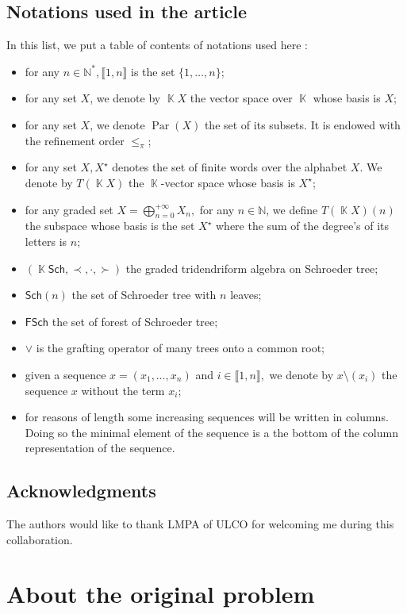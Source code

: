 \documentclass[a4paper,10pt]{amsart}
\DeclareMathOperator{\Par}{Par}
\DeclareMathOperator{\K}{\mathbb{K}}
\newcommand\Sch{\mathsf{Sch}}
\newcommand\SchF{\mathsf{FSch}}
\newcommand\nn{n}
\newcommand\NN{\mathbb{N}}
\newcommand\pleft{\prec}
\newcommand\pmid{\cdot}
\newcommand\pright{\succ}
\newcommand{\IEM}[2]{\llbracket #1,#2 \rrbracket}
\theoremstyle{definition}
\begin{document}
\subsection{Notations used in the article}

In this list, we put a table of contents of notations used here :
\begin{itemize} %
	\item for any $n\in\NN^*, \IEM{1}{n}$ is the set $\{1,\dots, n\}$;
	\item for any set $X$, we denote by $\K X$ the vector space over $\K$ whose basis is $X$;
	\item for any set $X$, we denote $\Par(X)$ the set of its subsets. It is endowed with the refinement order $\leq_{\pi}$;
	\item for any set $X, X^{\star}$ denotes the set of finite words over the alphabet $X$. We denote by $T(\K X)$ the $\K$-vector space whose basis is $X^{\star}$;
	\item for any graded set $X=\bigoplus_{n=0}^{+\infty} X_n,$ for any $n\in\NN$, we define $T(\K X)(n)$ the subspace whose basis is the set $X^{\star}$ where the sum of the degree's of its letters is $n$; 
	\item $(\K\Sch, \pleft, \pmid, \pright)$ the graded tridendriform algebra on Schroeder tree;
	\item $\Sch(\nn)$ the set of Schroeder tree with $\nn$ leaves;
	\item $\SchF$ the set of forest of Schroeder tree;
	\item $\vee$ is the grafting operator of many trees onto a common root;
	\item given a sequence $x=(x_1,\dots, x_n)$ and $i\in\IEM{1}{n},$ we denote by $x\setminus (x_i)$ the sequence $x$ without the term $x_i$;
	\item for reasons of length some increasing sequences will be written in columns. Doing so the minimal element of the sequence is a the bottom of the column representation of the sequence.
\end{itemize}

\subsection{Acknowledgments}

The authors would like to thank LMPA of ULCO for welcoming me during this collaboration.

\section{About the original problem} \label{sec:the_problem}
\end{document}
